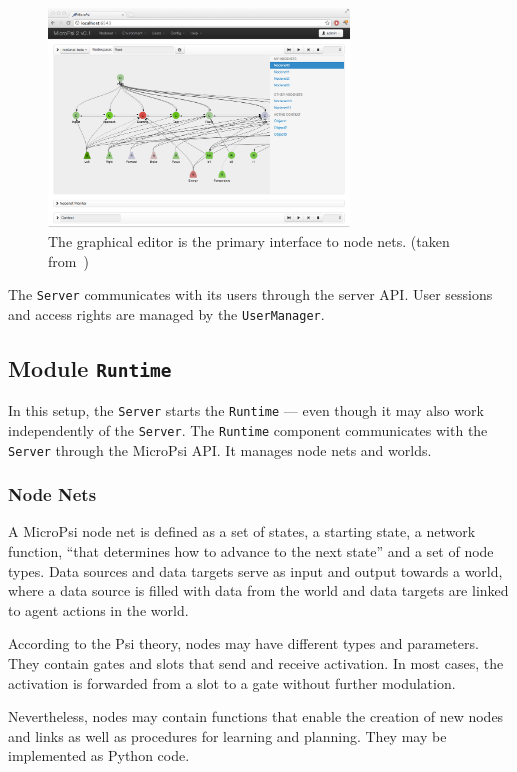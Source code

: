\begin{figure}[h]
  \centering
    \includegraphics[width=8cm]{graphics/micropsi2_nodenet}
  \caption{The graphical editor is the primary interface to node nets. (taken from~\cite{conf/agi/Bach12})}
  \label{micropsi2_nodenet}
\end{figure}

The \texttt{Server} communicates with its users through the server API. User sessions and access rights are managed by the \texttt{UserManager}.
   
        \subsection{Module \texttt{Runtime}}
In this setup, the \texttt{Server} starts the \texttt{Runtime} --- even though it may also work independently of the \texttt{Server}. The \texttt{Runtime} component communicates with the \texttt{Server} through the MicroPsi API. It manages node nets and worlds.

        \subsubsection{Node Nets}
A MicroPsi node net is defined as a set of states, a starting state, a network function, ``that determines how to advance to the next state'' and a set of node types. Data sources and data targets serve as input and output towards a world, where a data source is filled with data from the world and data targets are linked to agent actions in the world.

According to the Psi theory, nodes may have different types and parameters. They contain gates and slots that send and receive activation. In most cases, the activation is forwarded from a slot to a gate without further modulation.

Nevertheless, nodes may contain functions that enable the creation of new nodes and links as well as procedures for learning and planning. They may be implemented as Python code.

